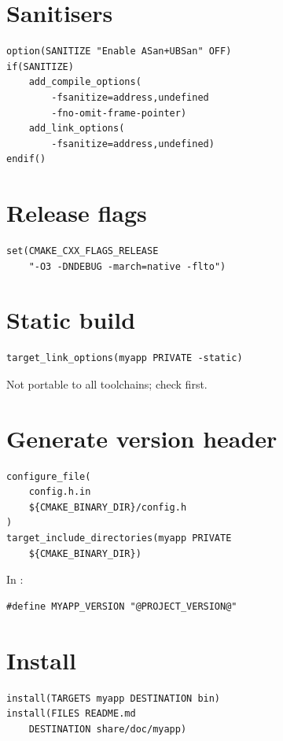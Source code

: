 \section{Sanitisers}

\begin{lstlisting}
option(SANITIZE "Enable ASan+UBSan" OFF)
if(SANITIZE)
    add_compile_options(
        -fsanitize=address,undefined
        -fno-omit-frame-pointer)
    add_link_options(
        -fsanitize=address,undefined)
endif()
\end{lstlisting}

\section{Release flags}

\begin{lstlisting}
set(CMAKE_CXX_FLAGS_RELEASE
    "-O3 -DNDEBUG -march=native -flto")
\end{lstlisting}

\section{Static build}

\begin{lstlisting}
target_link_options(myapp PRIVATE -static)
\end{lstlisting}

Not portable to all toolchains; check first.

\section{Generate version header}

\begin{lstlisting}
configure_file(
    config.h.in
    ${CMAKE_BINARY_DIR}/config.h
)
target_include_directories(myapp PRIVATE
    ${CMAKE_BINARY_DIR})
\end{lstlisting}

In :

\begin{lstlisting}
#define MYAPP_VERSION "@PROJECT_VERSION@"
\end{lstlisting}

\section{Install}

\begin{lstlisting}
install(TARGETS myapp DESTINATION bin)
install(FILES README.md
    DESTINATION share/doc/myapp)
\end{lstlisting}

